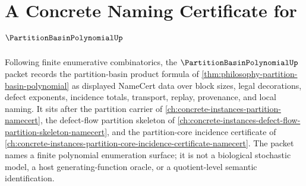 \chapter{A Concrete Naming Certificate for $\PartitionBasinPolynomialUp$}
\label{ch:concrete-instances-partition-basin-polynomial-namecert}

Following finite enumerative combinatorics, the $\PartitionBasinPolynomialUp$ packet records the partition-basin product formula of \autoref{thm:philosophy-partition-basin-polynomial} as displayed NameCert data over block sizes, legal decorations, defect exponents, incidence totals, transport, replay, provenance, and local naming. It sits after the partition carrier of \autoref{ch:concrete-instances-partition-namecert}, the defect-flow partition skeleton of \autoref{ch:concrete-instances-defect-flow-partition-skeleton-namecert}, and the partition-core incidence certificate of \autoref{ch:concrete-instances-partition-core-incidence-certificate-namecert}. The packet names a finite polynomial enumeration surface; it is not a biological stochastic model, a host generating-function oracle, or a quotient-level semantic identification.

